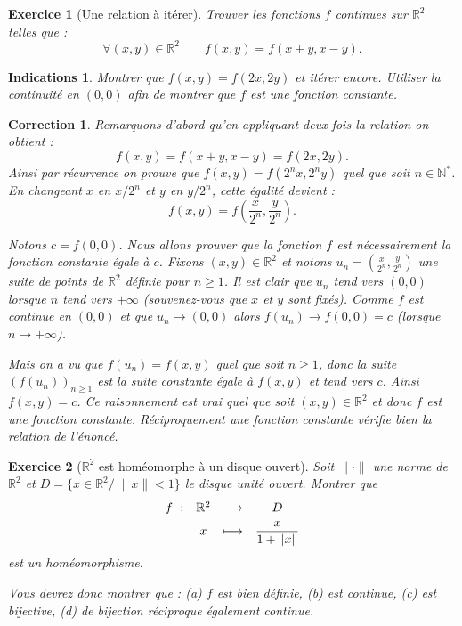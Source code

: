\documentclass[11pt,a4paper]{article}
\newcommand{\Nn}{\mathbb{N}} \newcommand{\N}{\mathbb{N}}
\newcommand{\Rr}{\mathbb{R}} \newcommand{\R}{\mathbb{R}}
\renewcommand{\ge}{\geqslant} \renewcommand{\geq}{\geqslant}
\theoremstyle{exostyle}
\newtheorem{exo}{Exercice}
\newtheorem{ind}{Indications}
\newtheorem{cor}{Correction}
\newcommand{\exercice}[1]{} \newcommand{\finexercice}{}
\newcommand{\enonce}{\begin{exo}} \newcommand{\finenonce}{\end{exo}}
\newcommand{\indication}{\begin{ind}} \newcommand{\finindication}{\end{ind}}
\newcommand{\correction}{\begin{cor}} \newcommand{\fincorrection}{\end{cor}}
\newcommand{\noindication}{\stepcounter{ind}}
\begin{document}
\finexercice


\exercice{1793, gourio, 2001/09/01}

\enonce[Une relation à itérer]
Trouver les fonctions $f$ continues sur $\Rr^2$ telles que :
$$\forall (x,y)\in \Rr^2 \qquad f(x,y)=f(x+y,x-y). $$
\finenonce

\indication
Montrer que $f(x,y) = f(2x,2y)$ et itérer encore. 
Utiliser la continuité en $(0,0)$ afin de montrer que $f$ est une fonction constante.
\finindication

\correction
Remarquons d'abord qu'en appliquant deux fois la relation on obtient :
\[
f(x,y)=f(x+y,x-y) = f(2x,2y).
\]
Ainsi par récurrence on prouve que $f(x,y)=f(2^nx,2^ny)$ quel que soit $n\in\Nn^*$.
En changeant $x$ en $x/2^n$ et $y$ en $y/2^n$, cette égalité devient :
\[
f(x,y)=f\left( \frac{x}{2^n}, \frac{y}{2^n} \right).
\]

Notons $c = f(0,0)$. Nous allons prouver que la fonction $f$ est nécessairement la fonction constante égale à $c$.
Fixons $(x,y) \in \Rr^2$ et notons $u_n = \left( \frac{x}{2^n}, \frac{y}{2^n} \right)$ une suite de points de $\Rr^2$ définie pour $n \ge 1$. Il est clair que $u_n$ tend vers $(0,0)$ lorsque $n$ tend vers $+\infty$ (souvenez-vous que $x$ et $y$ sont fixés).
Comme $f$ est continue en $(0,0)$ et que $u_n \to (0,0)$ alors $f(u_n) \to f(0,0)=c$ (lorsque $n \to +\infty$).

Mais on a vu que $f(u_n) = f(x,y)$ quel que soit $n\ge1$, donc la suite $( f(u_n) )_{n\ge1}$ est la suite constante égale à $f(x,y)$ et tend vers $c$. Ainsi $f(x,y)=c$.
Ce raisonnement est vrai quel que soit $(x,y)\in\Rr^2$ et donc $f$ est une fonction constante.
Réciproquement une fonction constante vérifie bien la relation de l'énoncé.
\fincorrection
\finexercice


\exercice{5900, rouget, 2010/10/16}
\enonce[$\Rr^2$ est homéomorphe à un disque ouvert]

Soit $\| \cdot \|$ une norme de $\Rr^2$ et $D=\{x\in \Rr^2  /\; \|x\| < 1\}$ le disque unité ouvert.
Montrer que 
$$\begin{array}[t]{cccc}
	f~:&\Rr^2&\longrightarrow&D\\[1ex]
	&x&\longmapsto& \dfrac{x}{1+\|x\|}
\end{array}$$ 
est un homéomorphisme. 

Vous devrez donc montrer que : (a) $f$ est bien définie, (b) est continue, (c) est bijective, (d) de bijection réciproque également continue.
\finenonce

\noindication
\end{document}
